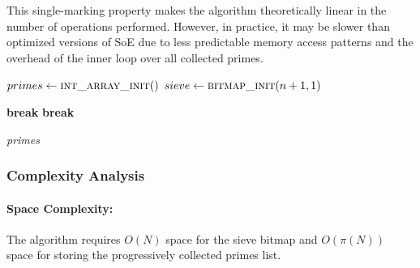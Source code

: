 \documentclass{article}
\begin{document}
This single-marking property makes the algorithm theoretically linear in the number of operations performed. However, in practice, it may be slower than optimized versions of SoE due to less predictable memory access patterns and the overhead of the inner loop over all collected primes.

\begin{algorithm}[H]
    \caption{Sieve of Euler (SoEu)}
    \begin{algorithmic}[1]        
            \State {}
            \State {} $primes \gets \Call{int\_array\_init}$ 
            \State {} 
            \State {} $sieve \gets \Call{bitmap\_init}{n + 1, 1}$ 

            \State {}
             
                 
                    \State {} 
                \EndIf
                
                 
                     \textbf{break} 
                    \EndIf 
                    \State {} 
                     \textbf{break}  
                    \EndIf
                \EndFor
            \EndFor

            \State {}
            \State \Return \emph{primes}
        \EndProcedure
    \end{algorithmic}
\end{algorithm}

\subsubsection*{Complexity Analysis}

\paragraph{Space Complexity:} The algorithm requires $O(N)$ space for the sieve bitmap and $O(\pi(N))$ space for storing the progressively collected primes list.
\end{document}

